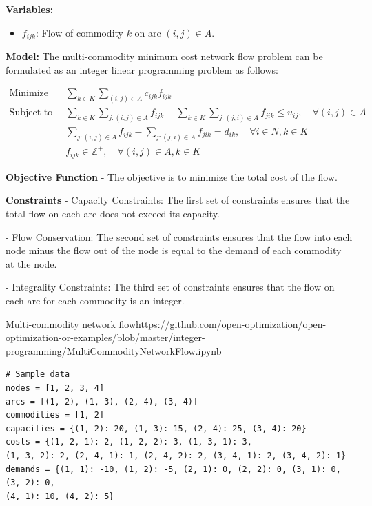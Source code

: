 {\noindent \textbf{Variables:}
\begin{itemize}
\item \( f_{ijk} \): Flow of commodity \( k \) on arc \( (i, j) \in A \).
\end{itemize}

\noindent \textbf{Model:}
The multi-commodity minimum cost network flow problem can be formulated as an integer linear programming problem as follows:

\begin{align*}
\text{Minimize} \quad & \sum_{k \in K} \sum_{(i, j) \in A} c_{ijk} f_{ijk} \\
\text{Subject to} \quad & \sum_{k \in K} \sum_{j:(i, j) \in A} f_{ijk} - \sum_{k \in K} \sum_{j:(j, i) \in A} f_{jik} \leq u_{ij}, \quad \forall (i, j) \in A \\
& \sum_{j:(i, j) \in A} f_{ijk} - \sum_{j:(j, i) \in A} f_{jik} = d_{ik}, \quad \forall i \in N, k \in K \\
& f_{ijk} \in \mathbb{Z}^+, \quad \forall (i, j) \in A, k \in K
\end{align*}

\noindent \textbf{Objective Function}
- The objective is to minimize the total cost of the flow.

\noindent \textbf{Constraints}
- Capacity Constraints: The first set of constraints ensures that the total flow on each arc does not exceed its capacity.

- Flow Conservation: The second set of constraints ensures that the flow into each node minus the flow out of the node is equal to the demand of each commodity at the node.

- Integrality Constraints: The third set of constraints ensures that the flow on each arc for each commodity is an integer.

\begin{examplewithcode}{Multi-commodity network flow}{https://github.com/open-optimization/open-optimization-or-examples/blob/master/integer-programming/MultiCommodityNetworkFlow.ipynb}
\begin{verbatim}
# Sample data
nodes = [1, 2, 3, 4]
arcs = [(1, 2), (1, 3), (2, 4), (3, 4)]
commodities = [1, 2]
capacities = {(1, 2): 20, (1, 3): 15, (2, 4): 25, (3, 4): 20}
costs = {(1, 2, 1): 2, (1, 2, 2): 3, (1, 3, 1): 3, 
(1, 3, 2): 2, (2, 4, 1): 1, (2, 4, 2): 2, (3, 4, 1): 2, (3, 4, 2): 1}
demands = {(1, 1): -10, (1, 2): -5, (2, 1): 0, (2, 2): 0, (3, 1): 0, (3, 2): 0, 
(4, 1): 10, (4, 2): 5}
\end{verbatim}


\end{examplewithcode}}
